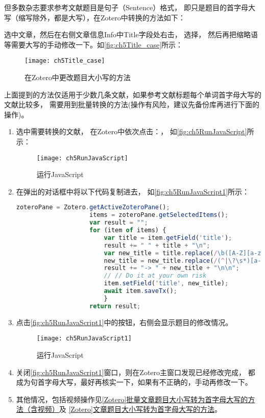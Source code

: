 \documentclass[cn,11pt,chinese]{elegantbook}
\begin{document}
			但多数杂志要求参考文献题目是句子（Sentence）格式，
			即只是题目的首字母大写（缩写除外，都是大写），在Zotero中转换的方法如下：
			
			选中文章，然后在右侧文章信息Info中Title字段处右击，
			选择，
			然后再把缩略语等需要大写的手动修改一下。如\autoref{fig:ch5Title_case}所示：
			
				\begin{figure}[htbp]
					\centering
					\texttt{[image: ch5Title\_case]}
					\caption{在Zotero中更改题目大小写的方法}
					\label{fig:ch5Title_case}
				\end{figure}

				
			上面提到的方法仅适用于少数几条文献，如果参考文献标题每个单词首字母大写的文献比较多，
			需要用到批量转换的方法(操作有风险，建议先备份库再进行下面的操作)。
			\begin{enumerate}
				\item 选中需要转换的文献，
				在Zotero中依次点击：，
				如\autoref{fig:ch5RunJavaScript}所示：

				  \begin{figure}[htbp]
					  \centering
					  \texttt{[image: ch5RunJavaScript]}
					  \caption{运行JavaScript}
					  \label{fig:ch5RunJavaScript}
				  \end{figure}
				\item 在弹出的对话框中将以下代码复制进去，
				如\autoref{fig:ch5RunJavaScript1}所示：
				
				\begin{lstlisting}[language=JavaScript]
					zoteroPane = Zotero.getActiveZoteroPane();
					items = zoteroPane.getSelectedItems();
					var result = "";
					for (item of items) {
						var title = item.getField('title');
						result += " " + title + "\n";
						var new_title = title.replace(/\b([A-Z][a-z0-9]+|A)\b/g, function (x) { return x.toLowerCase(); });
						new_title = new_title.replace(/(^|\?\s*)[a-z]/, function (x) { return x.toUpperCase(); });
						result += "-> " + new_title + "\n\n";
						// // Do it at your own risk
						item.setField('title', new_title);
						await item.saveTx();
						}
					return result;
				\end{lstlisting}
				\item 点击\autoref{fig:ch5RunJavaScript1}中的按钮，右侧会显示题目的修改情况。
						\begin{figure}[htbp]
							\centering
							\texttt{[image: ch5RunJavaScript1]}
							\caption{运行JavaScript}
							\label{fig:ch5RunJavaScript1}
						\end{figure}
				\item 关闭\autoref{fig:ch5RunJavaScript1}窗口，则在Zotero主窗口发现已经修改完成，
				都成为句首字母大写，最好再核实一下，如果有不正确的，手动再修改一下。
				\item 其他情况，包括视频操作见\href{https://zhuanlan.zhihu.com/p/283889592}
				{[Zotero]批量文章题目大小写转为首字母大写的方法（含视频）}及
				\href{https://zhuanlan.zhihu.com/p/60651053}
				{[Zotero]文章题目大小写转为首字母大写的方法}。
		    \end{enumerate}
			
\end{document}
